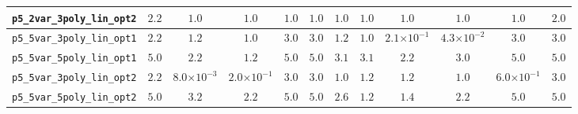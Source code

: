 \begin{landscape}
\begin{table}[H]
{\begin{tabular}{lccccccccccc}
\hline
\texttt{p5\_2var\_3poly\_lin\_opt2} & $2.2$ & \textbf{$1.0$} & \textbf{$1.0$} & \textbf{$1.0$} & \textbf{$1.0$} & \textbf{$1.0$} & \textbf{$1.0$} & \textbf{$1.0$} & \textbf{$1.0$} & $1.0$ & $2.0$ \\
\hline
\texttt{p5\_5var\_3poly\_lin\_opt1} & $2.2$ & $1.2$ & $1.0$ & $3.0$ & $3.0$ & $1.2$ & $1.0$ & $2.1{\scriptstyle\times 10^{-1}}$ & \textbf{$4.3{\scriptstyle\times 10^{-2}}$} & $3.0$ & $3.0$ \\
\hline
\texttt{p5\_5var\_5poly\_lin\_opt1} & $5.0$ & $2.2$ & \textbf{$1.2$} & $5.0$ & $5.0$ & $3.1$ & $3.1$ & $2.2$ & $3.0$ & $5.0$ & $5.0$ \\
\hline
\texttt{p5\_5var\_3poly\_lin\_opt2} & $2.2$ & \textbf{$8.0{\scriptstyle\times 10^{-3}}$} & $2.0{\scriptstyle\times 10^{-1}}$ & $3.0$ & $3.0$ & $1.0$ & $1.2$ & $1.2$ & $1.0$ & $6.0{\scriptstyle\times 10^{-1}}$ & $3.0$ \\
\hline
\texttt{p5\_5var\_5poly\_lin\_opt2} & $5.0$ & $3.2$ & $2.2$ & $5.0$ & $5.0$ & $2.6$ & \textbf{$1.2$} & $1.4$ & $2.2$ & $5.0$ & $5.0$ \\
\bottomrule
\end{tabular}
}%
\end{table}
\end{landscape}


